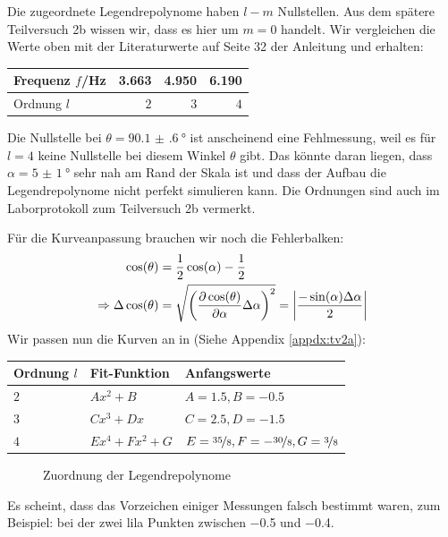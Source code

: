 		Die zugeordnete Legendrepolynome haben $l-m$ Nullstellen. Aus dem spätere Teilversuch 2b wissen wir, dass es hier um $m = 0$ handelt. Wir vergleichen die Werte oben mit der Literaturwerte auf Seite 32 der Anleitung und erhalten:
		\begin{center}
			\begin{tabular}{lrrr}
				\toprule
				Frequenz $f$/\si{\hertz} & \num{3.663} & \num{4.950} & \num{6.190} \\
				\midrule
				Ordnung $l$ & $2$ & $3$ & $4$\\
				\bottomrule				
			\end{tabular}
		\end{center}
		Die Nullstelle bei $\theta = \SI{90.1(6)}{\degree}$ ist anscheinend eine Fehlmessung, weil es für $l = 4$ keine Nullstelle bei diesem Winkel $\theta$ gibt. Das könnte daran liegen, dass $\alpha = \SI{5(1)}{\degree}$ sehr nah am Rand der Skala ist und dass der Aufbau die Legendrepolynome nicht perfekt simulieren kann. Die Ordnungen sind auch im Laborprotokoll zum Teilversuch 2b vermerkt.

		Für die Kurveanpassung brauchen wir noch die Fehlerbalken:
		\begin{align}
			\cos(\theta) &= \frac{1}{2}\cos(\alpha) - \frac{1}{2} \\
			\Rightarrow \Delta \cos(\theta) &= \gausserror{\cos(\theta)}{\alpha} = \abs{\frac{-\sin(\alpha)\Delta\alpha}{2}}
		\end{align}
		Wir passen nun die Kurven an in \gnuplot{} (Siehe Appendix \ref{appdx:tv2a}):
		\begin{center}
			\begin{tabular}{lll}
				\toprule
				Ordnung $l$ & Fit-Funktion & Anfangswerte \\
				\midrule
				$2$ & $Ax^2 + B$  & $A = 1.5, B = -0.5$ \\
				$3$ & $Cx^3 + Dx$ & $C = 2.5, D = -1.5$ \\
				$4$ & $Ex^4 + Fx^2 + G$  & $E = \nicefrac{35}{8}, F = -\nicefrac{30}{8}, G = \nicefrac{3}{8}$ \\
				\bottomrule
			\end{tabular}
		\end{center}
		\newpage
		\begin{figure}[!ht]
		    \centering
		    \resizebox{\textwidth}{!}{}
		    \caption{Zuordnung der Legendrepolynome}
		    \label{fig:tv1-2}
		\end{figure}
		Es scheint, dass das Vorzeichen einiger Messungen falsch bestimmt waren, zum Beispiel: bei der zwei lila Punkten zwischen \num{-0.5} und \num{-0.4}. 

